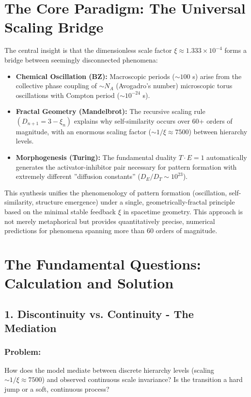 \section*{The Core Paradigm: The Universal Scaling Bridge}
	
	The central insight is that the dimensionless scale factor $\xi \approx 1.333 \times 10^{-4}$ forms a bridge between seemingly disconnected phenomena:
	
	\begin{itemize}[label=$\bullet$]
		\item \textbf{Chemical Oscillation (BZ):} Macroscopic periods ($\sim 100$ s) arise from the collective phase coupling of $\sim N_A$ (Avogadro's number) microscopic torus oscillations with Compton period ($\sim 10^{-24}$ s).
		
		\item \textbf{Fractal Geometry (Mandelbrot):} The recursive scaling rule $(D_{n+1} = 3 - \xi_n)$ explains why self-similarity occurs over 60+ orders of magnitude, with an enormous scaling factor ($\sim 1/\xi \approx 7500$) between hierarchy levels.
		
		\item \textbf{Morphogenesis (Turing):} The fundamental duality $T \cdot E = 1$ automatically generates the activator-inhibitor pair necessary for pattern formation with extremely different ''diffusion constants'' ($D_E/D_T \sim 10^{23}$).
	\end{itemize}
	
	This synthesis unifies the phenomenology of pattern formation (oscillation, self-similarity, structure emergence) under a single, geometrically-fractal principle based on the minimal stable feedback $\xi$ in spacetime geometry. This approach is not merely metaphorical but provides quantitatively precise, numerical predictions for phenomena spanning more than 60 orders of magnitude.
	
	\section*{The Fundamental Questions: Calculation and Solution}
	
	\subsection*{1. Discontinuity vs. Continuity - The Mediation}
	
	\subsubsection*{Problem:}
	How does the model mediate between discrete hierarchy levels (scaling $\sim 1/\xi \approx 7500$) and observed continuous scale invariance? Is the transition a hard jump or a soft, continuous process?
	
